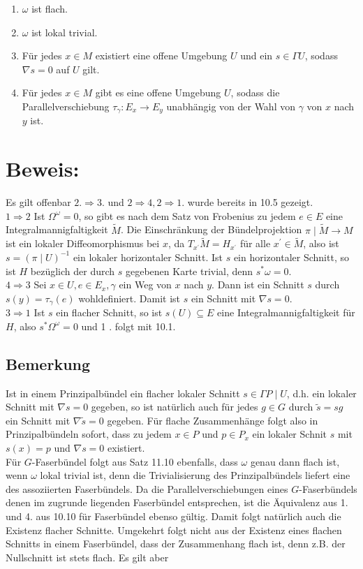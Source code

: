 \documentclass[10pt, letterpaper]{article}
\begin{document}
\begin{enumerate}
  \item $\omega$ ist flach.
  \item $\omega$ ist lokal trivial.
  \item Für jedes $x \in M$ existiert eine offene Umgebung $U$ und ein $s \in \Gamma U$, sodass $\nabla s=0$ auf $U$ gilt.
  \item Für jedes $x \in M$ gibt es eine offene Umgebung $U$, sodass die Parallelverschiebung $\tau_{\gamma}: E_{x} \rightarrow E_{y}$ unabhängig von der Wahl von $\gamma$ von $x$ nach $y$ ist.
\end{enumerate}

\section*{Beweis:}
Es gilt offenbar $2 . \Rightarrow 3$. und $2 \Rightarrow 4,2 \Rightarrow 1$. wurde bereits in 10.5 gezeigt.\\
$1 \Rightarrow 2$ Ist $\Omega^{\omega}=0$, so gibt es nach dem Satz von Frobenius zu jedem $e \in E$ eine Integralmannigfaltigkeit $\tilde{M}$. Die Einschränkung der Bündelprojektion $\pi \mid \tilde{M} \rightarrow M$ ist ein lokaler Diffeomorphismus bei $x$, da $T_{x^{\prime}} \tilde{M}=H_{x^{\prime}}$ für alle $x^{\prime} \in \tilde{M}$, also ist $s=(\pi \mid U)^{-1}$ ein lokaler horizontaler Schnitt. Ist $s$ ein horizontaler Schnitt, so ist $H$ bezüglich der durch $s$ gegebenen Karte trivial, denn $s^{*} \omega=0$.\\
$4 \Rightarrow 3$ Sei $x \in U, e \in E_{x}, \gamma$ ein Weg von $x$ nach $y$. Dann ist ein Schnitt $s$ durch $s(y)=\tau_{\gamma}(e)$ wohldefiniert. Damit ist $s$ ein Schnitt mit $\nabla s=0$.\\
$3 \Rightarrow 1$ Ist $s$ ein flacher Schnitt, so ist $s(U) \subseteq E$ eine Integralmannigfaltigkeit für $H$, also $s^{*} \Omega^{\omega}=0$ und 1 . folgt mit 10.1.

\subsection*{Bemerkung}
Ist in einem Prinzipalbündel ein flacher lokaler Schnitt $s \in \Gamma P \mid U$, d.h. ein lokaler Schnitt mit $\nabla s=0$ gegeben, so ist natürlich auch für jedes $g \in G$ durch $\tilde{s}=s g$ ein Schnitt mit $\nabla \tilde{s}=0$ gegeben. Für flache Zusammenhänge folgt also in Prinzipalbündeln sofort, dass zu jedem $x \in P$ und $p \in P_{x}$ ein lokaler Schnit $s$ mit $s(x)=p$ und $\nabla s=0$ existiert.\\
Für $G$-Faserbündel folgt aus Satz 11.10 ebenfalls, dass $\omega$ genau dann flach ist, wenn $\omega$ lokal trivial ist, denn die Trivialisierung des Prinzipalbündels liefert eine des assoziierten Faserbündels. Da die Parallelverschiebungen eines $G$-Faserbündels denen im zugrunde liegenden Faserbündel entsprechen, ist die Äquivalenz aus 1. und 4. aus 10.10 für Faserbündel ebenso gültig. Damit folgt natürlich auch die Existenz flacher Schnitte. Umgekehrt folgt nicht aus der Existenz eines flachen Schnitts in einem Faserbündel, dass der Zusammenhang flach ist, denn z.B. der Nullschnitt ist stets flach. Es gilt aber
\end{document}
